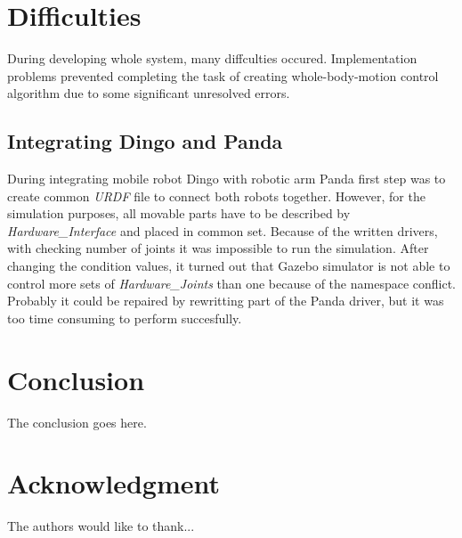 \documentclass[conference,a4paper]{IEEEtran}
\begin{document}
\section{Difficulties}
During developing whole system, many diffculties occured. Implementation problems prevented completing the task of creating whole-body-motion control algorithm due to some significant unresolved errors.

\subsection{Integrating Dingo and Panda}
During integrating mobile robot Dingo with robotic arm Panda first step was to create common \textit{URDF} file to connect both robots together. However, for the simulation purposes, all movable parts have to be described by \textit{Hardware\_Interface}
and placed in common set. Because of the written drivers, with checking number of joints it was impossible to run the simulation. After changing the condition values, it turned out that Gazebo simulator is not able to control more sets of \textit{Hardware\_Joints}
than one because of the namespace conflict. Probably it could be repaired by rewritting part of the Panda driver, but it was too time consuming to perform succesfully.

\section{Conclusion}
The conclusion goes here.

\section*{Acknowledgment}


The authors would like to thank...




\end{document}
